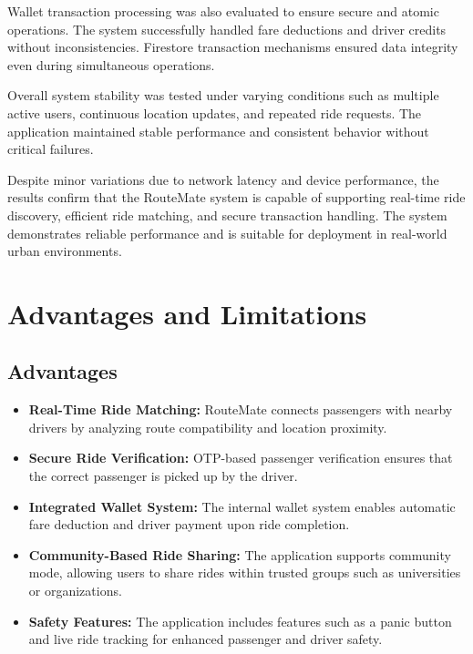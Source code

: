 \documentclass[10pt,a4paper]{report}
\begin{document}
\justify\large Wallet transaction processing was also evaluated to ensure secure and atomic operations. The system successfully handled fare deductions and driver credits without inconsistencies. Firestore transaction mechanisms ensured data integrity even during simultaneous operations.

\justify\large Overall system stability was tested under varying conditions such as multiple active users, continuous location updates, and repeated ride requests. The application maintained stable performance and consistent behavior without critical failures.

\justify\large Despite minor variations due to network latency and device performance, the results confirm that the RouteMate system is capable of supporting real-time ride discovery, efficient ride matching, and secure transaction handling. The system demonstrates reliable performance and is suitable for deployment in real-world urban environments.

\section{Advantages and Limitations}

\subsection{Advantages}
\begin{itemize}
\item \textbf{Real-Time Ride Matching:} RouteMate connects passengers with nearby drivers by analyzing route compatibility and location proximity.

\item\textbf{Secure Ride Verification:} OTP-based passenger verification ensures that the correct passenger is picked up by the driver.

\item\textbf{Integrated Wallet System:} The internal wallet system enables automatic fare deduction and driver payment upon ride completion.

\item \textbf{Community-Based Ride Sharing:} The application supports community mode, allowing users to share rides within trusted groups such as universities or organizations.

\item \textbf{Safety Features:} The application includes features such as a panic button and live ride tracking for enhanced passenger and driver safety.
\end{itemize}
\end{document}
